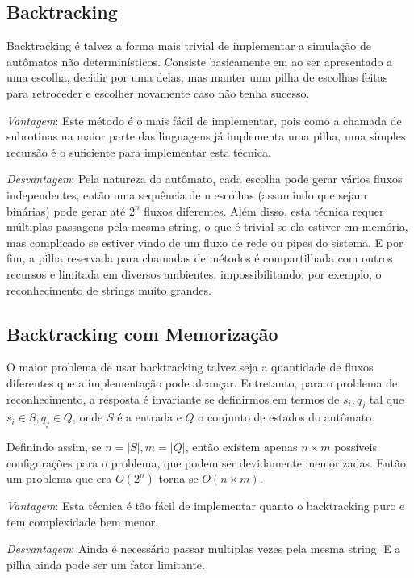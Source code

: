 \documentclass[a4paper,12pt,oneside,onecolumn]{uerj}
\begin{document}
\subsection{Backtracking}

Backtracking é talvez a forma mais trivial de implementar a simulação de autômatos não determinísticos. Consiste basicamente em ao ser apresentado a uma escolha, decidir por uma delas, mas manter uma pilha de escolhas feitas para retroceder e escolher novamente caso não tenha sucesso.

\emph{Vantagem}: Este método é o mais fácil de implementar, pois como a chamada de subrotinas na maior parte das linguagens já implementa uma pilha, uma simples recursão é o suficiente para implementar esta técnica.

\emph{Desvantagem}: Pela natureza do autômato, cada escolha pode gerar vários fluxos independentes, então uma sequência de n escolhas (assumindo que sejam binárias) pode gerar até $2^n$ fluxos diferentes. Além disso, esta técnica requer múltiplas passagens pela mesma string, o que é trivial se ela estiver em memória, mas complicado se estiver vindo de um fluxo de rede ou pipes do sistema. E por fim, a pilha reservada para chamadas de métodos é compartilhada com outros recursos e limitada em diversos ambientes, impossibilitando, por exemplo, o reconhecimento de strings muito grandes.

\subsection{Backtracking com Memorização}

O maior problema de usar backtracking talvez seja a quantidade de fluxos diferentes que a implementação pode alcançar. Entretanto, para o problema de reconhecimento, a resposta é invariante se definirmos em termos de $s_i, q_j$ tal que $s_i \in S, q_j \in Q$, onde $S$ é a entrada e $Q$ o conjunto de estados do autômato.

Definindo assim, se $n = |S|, m = |Q|$, então existem apenas $n \times m$ possíveis configurações para o problema, que podem ser devidamente memorizadas. Então um problema que era $O(2^n)$ torna-se $O(n\times m)$.

\emph{Vantagem}: Esta técnica é tão fácil de implementar quanto o backtracking puro e tem complexidade bem menor.

\emph{Desvantagem}: Ainda é necessário passar multiplas vezes pela mesma string. E a pilha ainda pode ser um fator limitante.
\end{document}
